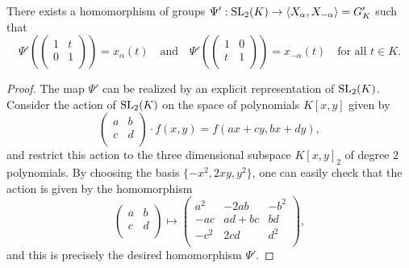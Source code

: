\begin{proposition}\label{prop:homSL2version1}
    There exists a homomorphism of groups 
    $\Psi':\mathrm{SL}_2(K)\rightarrow\langle X_\alpha,X_{-\alpha}\rangle=G'_K$
    such that 
    $$\Psi'\left(\begin{pmatrix}
        1 & t\\
        0 & 1\\
    \end{pmatrix}\right)=x_\alpha(t)\quad\text{and}\quad\Psi'\left(\begin{pmatrix}
        1 & 0\\
        t & 1\\
    \end{pmatrix}\right)=x_{-\alpha}(t)\quad\text{for all $t\in K$}.$$
\end{proposition}
\begin{proof}
    The map $\Psi'$ can be realized by an explicit representation of $\mathrm{SL}_2(K)$. Consider the action of $\mathrm{SL}_2(K)$ on the space of polynomials $K[x,y]$ given by 
    $$\begin{pmatrix}
        a & b\\
        c & d\\
    \end{pmatrix}\cdot f(x,y)=f(ax+cy,bx+dy),$$
    and restrict this action to the three dimensional subspace $K[x,y]_2$ of degree $2$ polynomials. By choosing the basis $\{-x^2,2xy,y^2\}$, one can easily check that the action is given by the homomorphism
    $$\begin{pmatrix}
        a& b\\
        c&d\\
    \end{pmatrix}\longmapsto\begin{pmatrix}
        a^2 & -2ab & -b^2\\
        -ac & ad+bc & bd\\
        -c^2 & 2cd & d^2\\
    \end{pmatrix},$$
    and this is precisely the desired homomorphism $\Psi'$.
\end{proof}

